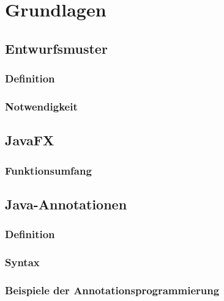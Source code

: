 \chapter{Grundlagen}
\label{grundlagen}


\section{Entwurfsmuster}
\label{entwurfsmuster}


\subsection{Definition}
\label{entwurfsmuster_definition}


\subsection{Notwendigkeit}
\label{entwurfsmuster_notwendigkeit}


\section{JavaFX}
\label{javafx}


\subsection{Funktionsumfang}
\label{javafx_funktionsumfang}


\section{Java-Annotationen}
\label{java_annotationen}


\subsection{Definition}
\label{java_annotationen_definition}


\subsection{Syntax}
\label{java_annotationen_anwendung}


\subsection{Beispiele der Annotationsprogrammierung}
\label{java_annotationen_annotationsprogrammierung}

